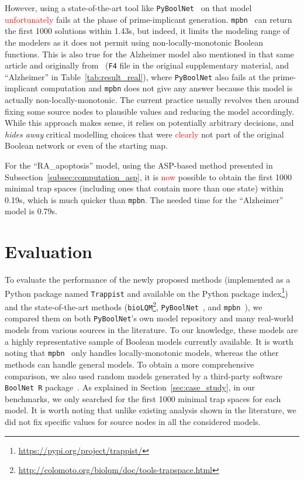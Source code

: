 \documentclass[preprint,12pt]{elsarticle}
\newcommand{\change}[1]{\textcolor{red}{#1}}
\begin{document}
However, using a state-of-the-art tool like \texttt{PyBoolNet}~\cite{klarner2015computing} on that model \change{unfortunately} fails at the phase of prime-implicant generation.
\texttt{mpbn}~\cite{Paulev2020} can return the first 1000 solutions within 1.43s, but indeed, it limits the modeling range of the modelers as it does not permit using non-locally-monotonic Boolean functions.
This is also true for the Alzheimer model also mentioned in that same article and originally from~\cite{ogishima2016alzpathway} (\verb|F4| file in the original supplementary material, and ``Alzheimer'' in Table~\ref{tab:result_real}), where \texttt{PyBoolNet} also fails at the prime-implicant computation and \texttt{mpbn} does not give any answer because this model is actually non-locally-monotonic.
The current practice usually revolves then around fixing some source nodes to plausible values and reducing the model accordingly.
While this approach makes sense, it relies on potentially arbitrary decisions, and \emph{hides away} critical modelling choices that were \change{clearly} not part of the original Boolean network or even of the starting map.

For the ``RA\_apoptosis'' model, using the ASP-based method presented in Subsection~\ref{subsec:computation_asp}, it is \change{now} possible to obtain the first 1000 minimal trap spaces (including ones that contain more than one state) within 0.19s, which is much quicker than \texttt{mpbn}.
The needed time for the ``Alzheimer'' model is 0.79s.


\section{Evaluation}%
\label{sec:eval}

To evaluate the performance of the newly proposed methods (implemented as a Python package named \texttt{Trappist} and available on the Python package index\footnote{\url{https://pypi.org/project/trappist/}}) and the state-of-the-art methods (\texttt{bioLQM}\footnote{\url{http://colomoto.org/biolqm/doc/tools-trapspace.html}}, \texttt{PyBoolNet}~\cite{klarner2015computing,klarner2017pyboolnet}, and \texttt{mpbn}~\cite{Paulev2020}), we compared them on both \texttt{PyBoolNet}'s own model repository and many real-world models from various sources in the literature.
To our knowledge, these models are a highly representative sample of Boolean models currently available.
It is worth noting that \texttt{mpbn}~\cite{Paulev2020} only handles locally-monotonic models, whereas the other methods can handle general models.
To obtain a more comprehensive comparison, we also used random models generated by a third-party software \texttt{BoolNet R} package~\cite{mussel2010boolnet}.
As explained in Section~\ref{sec:case_study}, in our benchmarks, we only searched for the first 1000 minimal trap spaces for each model.
It is worth noting that unlike existing analysis shown in the literature, we did not fix specific values for source nodes in all the considered models.
\end{document}
